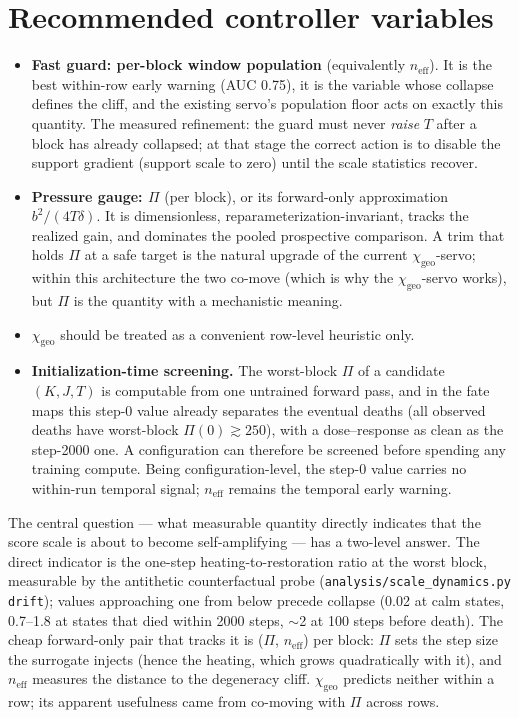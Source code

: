 \documentclass[11pt,a4paper]{article}
\newcommand{\code}[1]{\texttt{#1}}
\newcommand{\neff}{n_{\mathrm{eff}}}
\newcommand{\chigeo}{\chi_{\mathrm{geo}}}
\newcommand{\Pisurr}{\Pi}
\begin{document}
\section{Recommended controller variables}

\begin{itemize}[leftmargin=1.4em]
\item \textbf{Fast guard: per-block window population} (equivalently
\(\neff\)). It is the best within-row early warning (AUC 0.75), it is the
variable whose collapse defines the cliff, and the existing servo's
population floor acts on exactly this quantity. The measured refinement:
the guard must never \emph{raise} \(T\) after a block has already
collapsed; at that stage the correct action is to disable the support
gradient (support scale to zero) until the scale statistics recover.
\item \textbf{Pressure gauge: \(\Pisurr\)} (per block), or its forward-only
approximation \(b^2/(4T\delta)\). It is dimensionless,
reparameterization-invariant, tracks the realized gain, and dominates the
pooled prospective comparison. A trim that holds \(\Pisurr\) at a safe
target is the natural upgrade of the current \(\chigeo\)-servo; within this
architecture the two co-move (which is why the \(\chigeo\)-servo works),
but \(\Pisurr\) is the quantity with a mechanistic meaning.
\item \(\chigeo\) should be treated as a convenient row-level heuristic
only.
\item \textbf{Initialization-time screening.} The worst-block \(\Pisurr\)
of a candidate \((K, J, T)\) is computable from one untrained forward
pass, and in the fate maps this step-0 value already separates the eventual
deaths (all observed deaths have worst-block \(\Pisurr(0) \gtrsim 250\)),
with a dose--response as clean as the step-2000 one. A configuration can
therefore be screened before spending any training compute. Being
configuration-level, the step-0 value carries no within-run temporal
signal; \(\neff\) remains the temporal early warning.
\end{itemize}

The central question --- what measurable quantity directly indicates that
the score scale is about to become self-amplifying --- has a two-level
answer. The direct indicator is the one-step heating-to-restoration ratio
at the worst block, measurable by the antithetic counterfactual probe
(\code{analysis/scale\_dynamics.py drift}); values approaching one from
below precede collapse (0.02 at calm states, 0.7--1.8 at states that died
within 2000 steps, \(\sim\)2 at 100 steps before death). The cheap
forward-only pair that tracks it is (\(\Pisurr\), \(\neff\)) per block:
\(\Pisurr\) sets the step size the surrogate injects (hence the heating,
which grows quadratically with it), and \(\neff\) measures the distance to
the degeneracy cliff. \(\chigeo\) predicts neither within a row; its
apparent usefulness came from co-moving with \(\Pisurr\) across rows.
\end{document}
